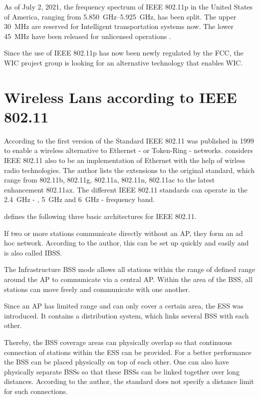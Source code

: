 \documentclass[]{nsm-thesis}
\begin{document}
As of July 2, 2021, the frequency spectrum of IEEE 802.11p in the United States of America, ranging from \SIrange{5,850}{5,925}{\giga\hertz}, has been split. The upper \SI{30}{\mega\hertz} are reserved for Intelligent transportation systems now. The lower \SI{45}{\mega\hertz} have been released for unlicensed operations \cite{noauthor_use_2021}.

Since the use of IEEE 802.11p has now been newly regulated by the FCC, the \ac{WIC} project group is looking for an alternative technology that enables \ac{WIC}.

\section{Wireless Lans according to IEEE 802.11}
According to \textcite{kauffels_wireless_2002} the first version of the Standard IEEE 802.11 was published in 1999 to enable a wireless alternative to Ethernet - or Token-Ring - networks.
\textcite{sauter_wireless_2022} considers IEEE 802.11 also to be an implementation of Ethernet with the help of wirless radio technologies. The author lists the extensions to the original standard, which range from 802.11b, 802.11g, 802.11a, 802.11n, 802.11ac to the latest enhancement 802.11ax. The different IEEE 802.11 standards can operate in the  \SI{2.4}{\giga\hertz} - , \SI{5}{\giga\hertz} and \SI{6}{\giga\hertz} - frequency band. 


\textcite{kauffels_wireless_2002} defines the following three basic architectures for IEEE 802.11.

If two or more stations communicate directly without an AP, they form an ad hoc network. According to the author, this can be set up quickly and easily and is also called \ac{IBSS}.

The Infrastructure \ac{BSS} mode allows all stations within the range of defined range around the \ac{AP} to communicate via a central \ac{AP}. Within the area of the \ac{BSS}, all stations can move freely and communicate with one another.

Since an \ac{AP} has limited range and can only cover a certain area, the \ac{ESS} was introduced. It contains a distribution system, which links several \ac{BSS} with each other.

Thereby, the BSS coverage areas can physically overlap so that continuous connection of stations within the ESS can be provided. For a better performance the \ac{BSS} can be placed physically on top of each other. One can also have physically separate \ac{BSS}s so that these \ac{BSS}s can be linked together over long distances. According to the author, the standard does not specify a distance limit for such connections. 
\end{document}
